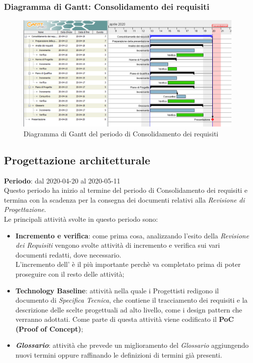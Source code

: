 	\subsubsection{Diagramma di Gantt: Consolidamento dei requisiti}
		\begin{figure}[h]
			\centering
			\includegraphics[width=1.1\textwidth]{./res/img/DiagrammiGantt/cons_req_gantt.png}
			\caption{Diagramma di Gantt del periodo di Consolidamento dei requisiti}
		\end{figure}
\newpage
\subsection{Progettazione architetturale}
\textbf{Periodo}: dal 2020-04-20 al 2020-05-11 \\
Questo periodo ha inizio al termine del periodo di Consolidamento dei requisiti e termina con la scadenza per la consegna dei documenti relativi alla \textit{Revisione di Progettazione}. \\
Le principali attività svolte in questo periodo sono:
\begin{itemize}
	\item \textbf{Incremento e verifica}: come prima cosa, analizzando l'esito della \textit{Revisione dei Requisiti} vengono svolte attività di incremento e verifica sui vari documenti redatti, dove necessario. \\
	L'incremento dell'\textit{\AdR{}} è il più importante perchè va completato prima di poter proseguire con il resto delle attività;
	\item \textbf{Technology Baseline}: attività nella quale i Progettisti redigono il documento di \textit{Specifica Tecnica}, che contiene il tracciamento dei requisiti e la descrizione delle scelte progettuali ad alto livello, come i design pattern che verranno adottati. Come parte di questa attività viene codificato il \textbf{PoC (Proof of Concept)};
	\item \textbf{\textit{Glossario}}: attività che prevede un miglioramento del \textit{Glossario} aggiungendo nuovi termini oppure raffinando le definizioni di termini già presenti.
\end{itemize}
